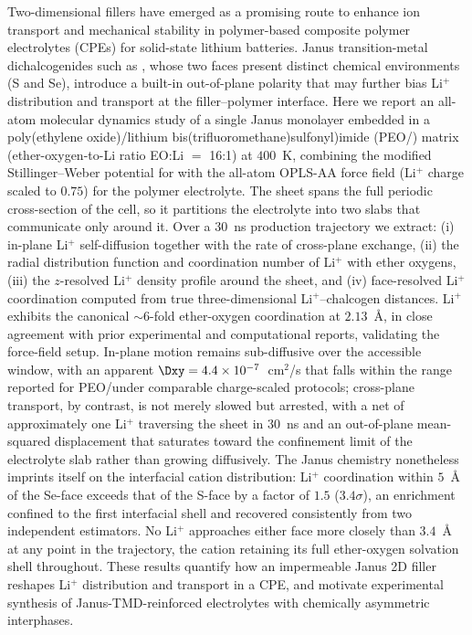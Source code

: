 Two-dimensional fillers have emerged as a promising route to enhance ion transport and mechanical stability in polymer-based composite polymer electrolytes (CPEs) for solid-state lithium batteries. Janus transition-metal dichalcogenides such as \WSSe, whose two faces present distinct chemical environments (S and Se), introduce a built-in out-of-plane polarity that may further bias Li$^+$ distribution and transport at the filler--polymer interface. Here we report an all-atom molecular dynamics study of a single Janus \WSSe monolayer embedded in a poly(ethylene oxide)/lithium bis(trifluoromethane)sulfonyl)imide (PEO/\LiTFSI) matrix (ether-oxygen-to-Li ratio EO:Li $=$ 16:1) at $400$~K, combining the modified Stillinger--Weber potential for \WSSe with the all-atom OPLS-AA force field (Li$^+$ charge scaled to $0.75$) for the polymer electrolyte. The sheet spans the full periodic cross-section of the cell, so it partitions the electrolyte into two slabs that communicate only around it. Over a $30$~ns production trajectory we extract: (i) in-plane Li$^+$ self-diffusion together with the rate of cross-plane exchange, (ii) the radial distribution function and coordination number of Li$^+$ with ether oxygens, (iii) the $z$-resolved Li$^+$ density profile around the sheet, and (iv) face-resolved Li$^+$ coordination computed from true three-dimensional Li$^+$--chalcogen distances. Li$^+$ exhibits the canonical $\sim6$-fold ether-oxygen coordination at $2.13$~\AA, in close agreement with prior experimental and computational reports, validating the force-field setup. In-plane motion remains sub-diffusive over the accessible window, with an apparent $\Dxy = 4.4\times10^{-7}$~cm$^2$/s that falls within the range reported for PEO/\LiTFSI under comparable charge-scaled protocols; cross-plane transport, by contrast, is not merely slowed but arrested, with a net of approximately one Li$^+$ traversing the sheet in $30$~ns and an out-of-plane mean-squared displacement that saturates toward the confinement limit of the electrolyte slab rather than growing diffusively. The Janus chemistry nonetheless imprints itself on the interfacial cation distribution: Li$^+$ coordination within $5$~\AA{} of the Se-face exceeds that of the S-face by a factor of $1.5$ ($3.4\sigma$), an enrichment confined to the first interfacial shell and recovered consistently from two independent estimators. No Li$^+$ approaches either face more closely than $3.4$~\AA{} at any point in the trajectory, the cation retaining its full ether-oxygen solvation shell throughout. These results quantify how an impermeable Janus 2D filler reshapes Li$^+$ distribution and transport in a CPE, and motivate experimental synthesis of Janus-TMD-reinforced electrolytes with chemically asymmetric interphases.


